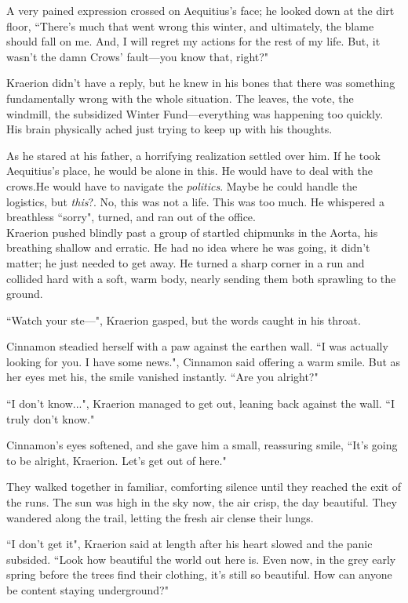 A very pained expression crossed on Aequitius's face; he looked down at the dirt floor, ``There's much that went wrong this winter, and ultimately, the blame should fall on me. And, I will regret my actions for the rest of my life. But, it wasn't the damn Crows' fault---you know that, right?"

Kraerion didn't have a reply, but he knew in his bones that there was something fundamentally wrong with the whole situation. The leaves, the vote, the windmill, the subsidized Winter Fund---everything was happening too quickly. His brain physically ached just trying to keep up with his thoughts.

As he stared at his father, a horrifying realization settled over him. If he took Aequitius's place, he would be alone in this. He would have to deal with the crows.He would have to navigate the \textit{politics}.
Maybe he could handle the logistics, but \textit{this}?. No, this was not a life. This was too much. He whispered a breathless ``sorry", turned, and ran out of the office.\\

Kraerion pushed blindly past a group of startled chipmunks in the Aorta, his breathing shallow and erratic. He had no idea where he was going, it didn't matter; he just needed to get away. He turned a sharp corner in a run and collided hard with a soft, warm body, nearly sending them both sprawling to the ground.

``Watch your ste---", Kraerion gasped, but the words caught in his throat.

Cinnamon steadied herself with a paw against the earthen wall.
``I was actually looking for you. I have some news.", Cinnamon said offering a warm smile. But as her eyes met his, the smile vanished instantly. ``Are you alright?"

``I don't know...", Kraerion managed to get out, leaning back against the wall. ``I truly don't know."

Cinnamon's eyes softened, and she gave him a small, reassuring smile, ``It's going to be alright, Kraerion. Let's get out of here."

They walked together in familiar, comforting silence until they reached the exit of the runs. The sun was high in the sky now, the air crisp, the day beautiful. They wandered along the trail, letting the fresh air clense their lungs.

``I don't get it", Kraerion said at length after his heart slowed and the panic subsided. ``Look how beautiful the world out here is. Even now, in the grey early spring before the trees find their clothing, it's still so beautiful. How can anyone be content staying underground?"


